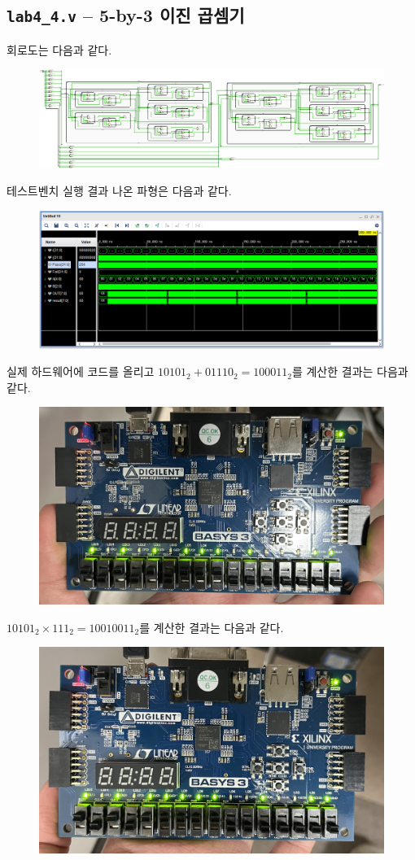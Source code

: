 \documentclass{scrartcl}
\begin{document}
\subsection{\texttt{lab4\_4.v} -- 5-by-3 이진 곱셈기}
회로도는 다음과 같다.
\begin{figure}[H]
  \centering
  \includegraphics[width=0.9\linewidth]{lab4_4_schematic-crop.pdf}
\end{figure}
테스트벤치 실행 결과 나온 파형은 다음과 같다.
\begin{figure}[H]
  \centering
  \includegraphics[width=0.9\linewidth]{lab4_4_waveform.png}
\end{figure}

실제 하드웨어에 코드를 올리고 \(10101_2 + 01110_2 = 100011_2\)를 계산한 결과는 다음과 같다.
\begin{figure}[H]
  \centering
  \includegraphics[width=0.8\linewidth]{add-hardware.jpg}
\end{figure}
\(10101_2 \times 111_2 = 10010011_2\)를 계산한 결과는 다음과 같다.
\begin{figure}[H]
  \centering
  \includegraphics[width=0.8\linewidth]{mul-hardware.jpg}
\end{figure}
\end{document}
